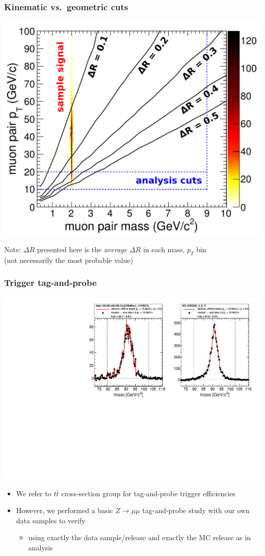 \documentclass[compress]{beamer}
\begin{document}
\begin{frame}
\frametitle{Kinematic vs.\ geometric cuts}
\begin{center}
\includegraphics[width=0.65\linewidth]{openingangle_with_signal.pdf}
\end{center}

Note: $\Delta R$ presented here is the {\it average} $\Delta R$ in
each mass, $p_T$ bin \\ (not necessarily the most probable value)

\end{frame}

\begin{frame}
\frametitle{Trigger tag-and-probe}

\includegraphics[width=\linewidth]{trigeff_endcapbarrel_0968.pdf}

\scriptsize
\begin{itemize}
\item We refer to $t\bar{t}$ cross-section group for tag-and-probe trigger efficiencies
\item However, we performed a basic $Z\to\mu\mu$ tag-and-probe study with our own data samples to verify
\begin{itemize}
\item \scriptsize using exactly the data sample/release and exactly the MC release as in analysis
\end{itemize}
\end{itemize}
\end{frame}
\end{document}
